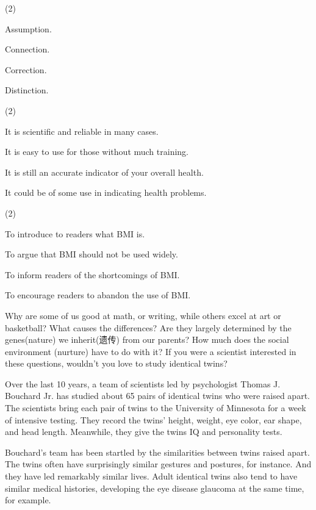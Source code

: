 \documentclass{英语试卷}
\begin{document}
\begin{choices}(2)
  \item Assumption.
  \item Connection.
  \item Correction.
  \item Distinction.
\end{choices}
\begin{choices}(2)
  \item It is scientific and reliable in many cases.
  \item It is easy to use for those without much training.
  \item It is still an accurate indicator of your overall health.
  \item It could be of some use in indicating health problems.
\end{choices}
\begin{choices}(2)
  \item To introduce to readers what BMI is.
  \item To argue that BMI should not be used widely.
  \item To inform readers of the shortcomings of BMI.
  \item To encourage readers to abandon the use of BMI.
\end{choices}
\par Why are some of us good at math, or writing, while others excel at art or basketball? What causes the differences? Are they largely determined by the genes(nature) we inherit(遗传) from our parents? How much does the social environment (nurture) have to do with it? If you were a scientist interested in these questions, wouldn't you love to study identical twins?\par
\par Over the last 10 years, a team of scientists led by psychologist Thomas J. Bouchard Jr. has studied about 65 pairs of identical twins who were raised apart. The scientists bring each pair of twins to the University of Minnesota for a week of intensive testing. They record the twins' height, weight, eye color, ear shape, and head length. Meanwhile, they give the twins IQ and personality tests.\par
\par Bouchard's team has been startled by the similarities between twins raised apart. The twins often have surprisingly similar gestures and postures, for instance. And they have led remarkably similar lives. Adult identical twins also tend to have similar medical histories, developing the eye disease glaucoma at the same time, for example.\par
\end{document}
